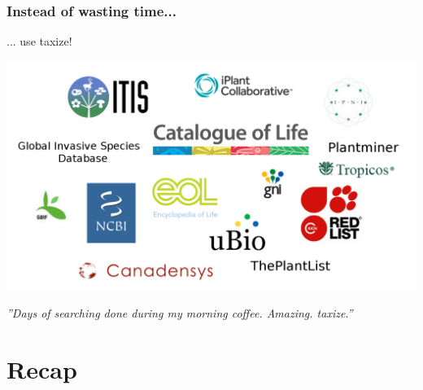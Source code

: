 \documentclass[10pt
	]{beamer}
\begin{document}
{%
\begin{frame}
\frametitle{Instead of wasting time...}
... use \alert{taxize!} \\
	\hspace*{-2cm}
	\begin{center}
	\includegraphics[height=0.6\textheight]{figs/sources_taxize.png}
	\end{center}

\emph{''Days of searching done during my morning coffee. Amazing. \alert{taxize}.''}
\end{frame}
}



\section*{Recap}
\end{document}

